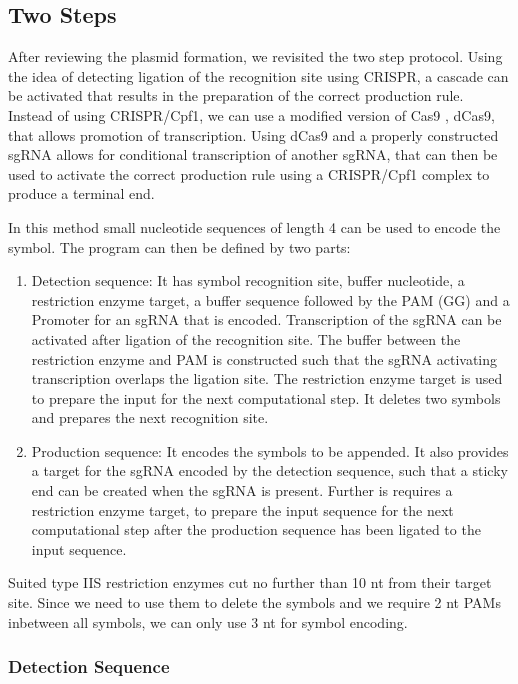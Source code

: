 \documentclass[
11pt, %
a4paper, %
oneside, %
headinclude,footinclude, %
BCOR5mm, %
]{scrartcl}
\begin{document}
\subsection{Two Steps}

After reviewing the plasmid formation, we revisited the two step protocol. Using
the idea of detecting ligation of the recognition site using CRISPR, a cascade
can be activated that results in the preparation of the correct production rule.
Instead of using CRISPR/Cpf1, we can use a modified version of Cas9 \cite{Bikard2013}, dCas9, that
allows promotion of transcription. Using dCas9 \cite{Gilbert2013} and a properly constructed sgRNA
allows for conditional transcription of another sgRNA, that can then be used to
activate the correct production rule using a CRISPR/Cpf1 complex to produce a
terminal end.

In this method small nucleotide sequences of length 4 can be used to encode the
symbol. The program can then be defined by two parts:
\begin{enumerate}
  \item Detection sequence: It has symbol recognition site, buffer nucleotide, a restriction enzyme
    target, a buffer sequence followed by the PAM (GG) and a Promoter for an sgRNA that is encoded. Transcription of the sgRNA can
    be activated after ligation of the recognition site. The buffer between the
    restriction enzyme and PAM is constructed such that the sgRNA activating
    transcription overlaps the ligation site. The restriction enzyme target is
    used to prepare the input for the next computational step. It deletes two
    symbols and prepares the next recognition site.
  \item Production sequence: It encodes the symbols to be appended. It also
    provides a target for the sgRNA encoded by the detection sequence, such that
    a sticky end can be created when the sgRNA is present. Further is requires a
    restriction enzyme target, to prepare the input sequence for the next
    computational step after the production sequence has been ligated to the
    input sequence.
\end{enumerate}
Suited type IIS restriction enzymes cut no further than 10 nt from their target
site. Since we need to use them to delete the symbols and we require 2 nt PAMs
inbetween all symbols, we can only use 3 nt for symbol encoding.

\subsubsection{Detection Sequence}
\end{document}
